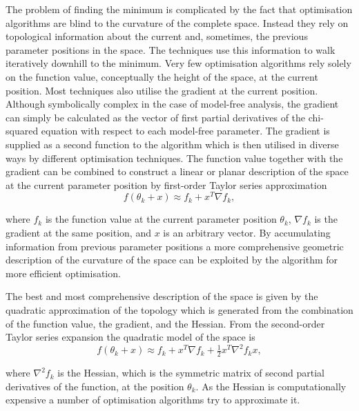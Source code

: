 \begin{htmlonly}
\begin{htmlonly}
The problem of finding the minimum is complicated by the fact that optimisation algorithms are blind to the curvature of the complete space.  Instead they rely on topological information about the current and, sometimes, the previous parameter positions in the space.  The techniques use this information to walk iteratively downhill to the minimum.  Very few optimisation algorithms rely solely on the function value, conceptually the height of the space, at the current position.  Most techniques also utilise the gradient at the current position.  Although symbolically complex in the case of model-free analysis, the gradient can simply be calculated as the vector of first partial derivatives of the chi-squared equation with respect to each model-free parameter.  The gradient is supplied as a second function to the algorithm which is then utilised in diverse ways by different optimisation techniques.  The function value together with the gradient can be combined to construct a linear or planar description of the space at the current parameter position by first-order Taylor series approximation
\begin{equation} \label{eq: linear model}
 f(\theta_k + x) \approx f_k  +  x^T \nabla f_k,
\end{equation}

\noindent where $f_k$ is the function value at the current parameter position $\theta_k$, $\nabla f_k$ is the gradient at the same position, and $x$ is an arbitrary vector.  By accumulating information from previous parameter positions a more comprehensive geometric description of the curvature of the space can be exploited by the algorithm for more efficient optimisation.

The best and most comprehensive description of the space is given by the quadratic approximation of the topology which is generated from the combination of the function value, the gradient, and the Hessian.  From the second-order Taylor series expansion the quadratic model of the space is
\begin{equation} \label{eq: quadratic model}
 f(\theta_k + x) \approx f_k  +  x^T \nabla f_k  +  \tfrac{1}{2} x^T \nabla^2 f_k x,
\end{equation}

\noindent where $\nabla^2 f_k$ is the Hessian, which is the symmetric matrix of second partial derivatives of the function, at the position $\theta_k$.  As the Hessian is computationally expensive a number of optimisation algorithms try to approximate it.


\end{htmlonly}
\end{htmlonly}
